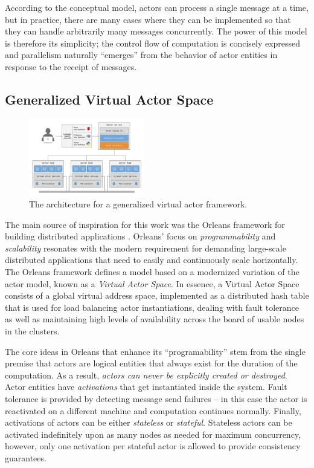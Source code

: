 \documentclass[draftclsnofoot,onecolumn,conference,11pt]{IEEEtran}
\begin{document}
According to the conceptual model, actors can process a single message at a time, but in practice, there are many cases where they can be implemented so that they can handle arbitrarily many messages concurrently. The power of this model is therefore its simplicity; the control flow of computation is concisely expressed and parallelism naturally ``emerges'' from the behavior of actor entities in response to the receipt of messages.

\subsection{Generalized Virtual Actor Space}

\begin{figure}[!t]
    \centering
    \includegraphics[width=0.45\textwidth]{architecture}
    \caption{The architecture for a generalized virtual actor framework.}
    \label{fig:architecture}
\end{figure}

The main source of inspiration for this work was the Orleans framework for building distributed applications \cite{bernstein_orleans:_2014}. Orleans' focus on \textit{programmability} and \textit{scalability} resonates with the modern requirement for demanding large-scale distributed applications that need to easily and continuously scale horizontally. The Orleans framework defines a model based on a modernized variation of the actor model, known as a \textit{Virtual Actor Space}. In essence, a Virtual Actor Space consists of a global virtual address space, implemented as a distributed hash table that is used for load balancing actor instantiations, dealing with fault tolerance as well as maintaining high levels of availability across the board of usable nodes in the clusters.

The core ideas in Orleans that enhance its ``programability'' stem from the single premise that actors are logical entities that always exist for the duration of the computation. As a result, \textit{actors can never be explicitly created or destroyed}. Actor entities have \textit{activations} that get instantiated inside the system. Fault tolerance is provided by detecting message send failures -- in this case the actor is reactivated on a different machine and computation continues normally. Finally, activations of actors can be either \textit{stateless} or \textit{stateful}. Stateless actors can be activated indefinitely upon as many nodes as needed for maximum concurrency, however, only one activation per stateful actor is allowed to provide consistency guarantees.
\end{document}
